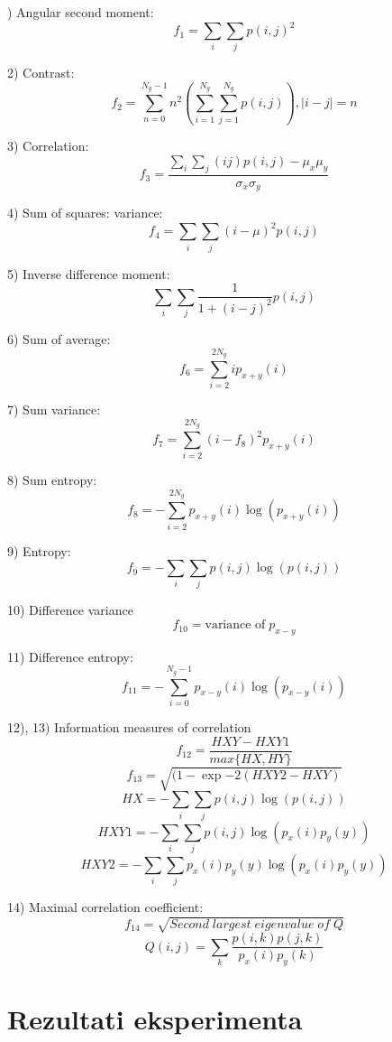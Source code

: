 \documentclass[times, utf8, zavrsni]{fer}
\begin{document}
) Angular second moment:
\[
f_1 = \sum_{i}\sum_{j}p(i,j)^2
\]

2) Contrast:
\[
f_2 = \sum_{n=0}^{N_g-1}n^2 \left( \sum_{i=1}^{N_g}\sum_{j=1}^{N_g}p(i,j) \right), \left| i-j \right| = n
\]

3) Correlation:
\[
f_3 = \frac{\sum_i\sum_j\left(ij\right)p(i,j) - \mu_x\mu_y}{\sigma_x\sigma_y}
\]

4) Sum of squares: variance:
\[
f_4 = \sum_i\sum_j(i-\mu)^2p(i,j)
\]

5) Inverse difference moment:
\[
\sum_i\sum_j \frac{1}{1+(i-j)^2}p(i,j)
\]

6) Sum of average:
\[
f_6 = \sum_{i=2}^{2N_g}ip_{x+y}(i)
\]

7) Sum variance:
\[
f_7 = \sum_{i=2}^{2N_g}(i-f_8)^2p_{x+y}(i)
\]

8) Sum entropy:
\[
f_8 = -\sum_{i=2}^{2N_g}p_{x+y}(i)\log(p_{x+y}(i))
\]

9) Entropy:
\[
f_9 = -\sum_i\sum_j p(i,j)\log(p(i,j))
\]

10) Difference variance
\[
f_{10} = \textrm{variance of} \; p_{x-y}
\]

11) Difference entropy:
\[
f_{11} = -\sum_{i=0}^{N_g-1}p_{x-y}(i)\log(p_{x-y}(i)) 
\]

12), 13) Information measures of correlation
\[
f_{12} = \frac{HXY - HXY1}{max\{HX,HY\}}
\]
\[
f_{13} = \sqrt{(1-\exp{-2(HXY2 - HXY)}}
\]
\[
HX = -\sum_i\sum_j p(i,j)\log(p(i,j))
\]
\[
HXY1 = -\sum_i\sum_j p(i,j)\log(p_x(i)p_y(y))
\]
\[
HXY2 = -\sum_i\sum_j p_x(i)p_y(y) \log(p_x(i)p_y(y))
\]

14) Maximal correlation coefficient:
\[
f_{14} = \sqrt{Second \; largest \; eigenvalue \; of \; Q}
\]
\[
Q(i,j) = \sum_k \frac{p(i,k)p(j,k)}{p_x(i)p_y(k)}
\]

\chapter{Rezultati eksperimenta}
\end{document}
